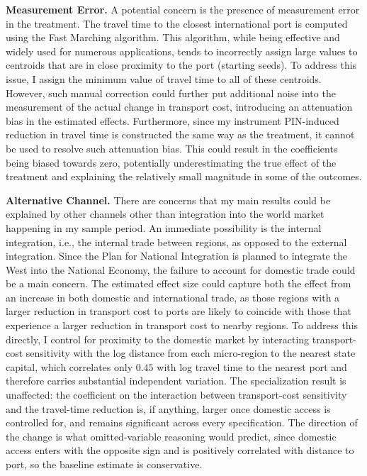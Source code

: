 \documentclass[11pt]{article}
\begin{document}
\noindent \textbf{Measurement Error.} A potential concern is the presence of measurement error in the treatment. The travel time to the closest international port is computed using the Fast Marching algorithm. This algorithm, while being effective and widely used for numerous applications, tends to incorrectly assign large values to centroids that are in close proximity to the port (starting seeds). To address this issue, I assign the minimum value of travel time to all of these centroids. However, such manual correction could further put additional noise into the measurement of the actual change in transport cost, introducing an attenuation bias in the estimated effects. Furthermore, since my instrument PIN-induced reduction in travel time is constructed the same way as the treatment, it cannot be used to resolve such attenuation bias. This could result in the coefficients being biased towards zero, potentially underestimating the true effect of the treatment and explaining the relatively small magnitude in some of the outcomes. 

\medskip\noindent \textbf{Alternative Channel.} There are concerns that my main results could be explained by other channels other than integration into the world market happening in my sample period. An immediate possibility is the internal integration, i.e., the internal trade between regions, as opposed to the external integration. Since the Plan for National Integration is planned to integrate the West into the National Economy, the failure to account for domestic trade could be a main concern. The estimated effect size could capture both the effect from an increase in both domestic and international trade, as those regions with a larger reduction in transport cost to ports are likely to coincide with those that experience a larger reduction in transport cost to nearby regions. To address this directly, I control for proximity to the domestic market by interacting transport-cost sensitivity with the log distance from each micro-region to the nearest state capital, which correlates only $0.45$ with log travel time to the nearest port and therefore carries substantial independent variation. The specialization result is unaffected: the coefficient on the interaction between transport-cost sensitivity and the travel-time reduction is, if anything, larger once domestic access is controlled for, and remains significant across every specification. The direction of the change is what omitted-variable reasoning would predict, since domestic access enters with the opposite sign and is positively correlated with distance to port, so the baseline estimate is conservative.
\end{document}

